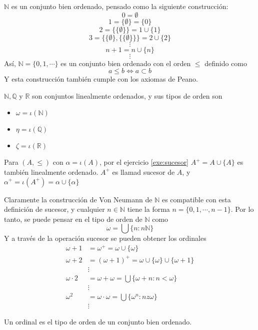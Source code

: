 \begin{exa}
$\mathbb{N}$ es un conjunto bien ordenado, pensado como la siguiente construcción:
$$0=\emptyset$$
$$1=\{\emptyset\}=\{0\}$$
$$2=\{\{\emptyset\}\}=1\cup\{1\}$$
$$3=\{\{\emptyset\},\{\{\emptyset\}\}\}=2\cup\{2\}$$
$$\vdots$$
$$n+1=n\cup \{n\}$$
$$\vdots$$
Así, $\mathbb{N}=\{0,1,\cdots\}$ es un conjunto bien ordenado con el orden $\leq$ definido como 
$$a\leq b \iff a\subset b$$
Y esta construcción también cumple con los axiomas de Peano.
\end{exa}
\begin{exa}
$\mathbb{N},\mathbb{Q}$ y $\mathbb{R}$ son conjuntos linealmente ordenados, y sus tipos de orden son 
\begin{itemize}
    \item $\omega=\iota(\mathbb{N})$
    \item $\eta=\iota(\mathbb{Q})$
    \item $\zeta=\iota(\mathbb{R})$
\end{itemize}
\end{exa}
\begin{defn}[Sucesor]
  Para $(A,\leq)$ con $\alpha=\iota(A)$, por el ejercicio \ref{exe:sucesor} $A^+=A\cup\{A\}$ es también linealmente ordenado. $A^+$ es llamad sucesor de $A$, y $\alpha^+=\iota(A^+)=\alpha\cup\{\alpha\}$
\end{defn}
Claramente la construcción de Von Neumann de $\mathbb{N}$ es compatible con esta definición de sucesor, y cualquier $n\in\mathbb{N}$ tiene la forma $n=\{0,1,\cdots,n-1\}$. Por lo tanto, se puede pensar en el tipo de orden de $\mathbb{N}$ como 
$$\omega=\bigcup\{n:n\mathbb{N}\}$$
Y a través de la operación sucesor se pueden obtener los ordinales
\begin{align*}
    \omega+1&=\omega^+=\omega\cup\{\omega\}\\
    \omega+2&=(\omega+1)^+=\omega\cup\{\omega\}\cup\{\omega+1\}\\
    &\vdots\\
    \omega\cdot2&=\omega+\omega=\bigcup\{\omega+n : n<\omega\}\\
    &\vdots\\
    \omega^2&=\omega\cdot\omega=\bigcup\{\omega^n:nz\omega\}\\
    &\vdots
\end{align*}
\begin{defn}[Ordinal]
  Un ordinal es el tipo de orden de un conjunto bien ordenado.
\end{defn}
